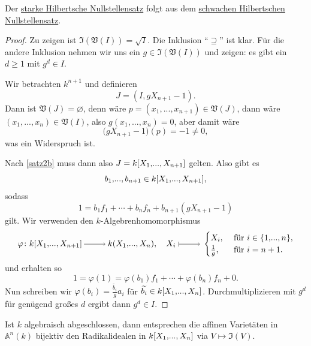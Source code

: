 \documentclass[a4paper,12pt,index=toc]{scrbook}
\theoremstyle{keinenummern} %
\def\A{\mathbb{A}}
\def\V{\mathfrak{V}}
\def\I{\mathfrak{I}}
\renewcommand{\phi}{\varphi}
\newcommand{\leer}{\ensuremath{\varnothing}}
\renewcommand{\dotsc}{\ensuremath{\!...}}
\newcommand{\schlange}[1]{\widetilde{#1}}
\newcommand{\polyx}[1][n]{\ensuremath%
  [X_{1},\dotsc,X_{#1}]}
\begin{document}
\begin{lem}
  Der \hyperref[satz2c]{starke Hilbertsche Nullstellensatz} folgt aus dem \hyperref[satz2b]{schwachen Hilbertschen Nullstellensatz}.
\end{lem}
\begin{proof}
Zu zeigen ist $\I(\V(I))=\sqrt{I}$. Die Inklusion \enquote{$\supseteq$} ist klar. Für die andere Inklusion nehmen wir uns ein
$g\in\I(\V(I))$ und zeigen: es gibt ein $d\ge1$ mit $g^d\in I$.

Wir betrachten $k^{n+1}$ und definieren \begin{equation*}J=(I,gX_{n+1}-1).\end{equation*} Dann ist $\V(J)=\leer$, denn wäre
$p=(x_1,\dotsc,x_{n+1})\in\V(J)$, dann wäre $(x_1,\dotsc,x_n)\in\V(I)$, also $g(x_1,\dotsc,x_n)=0$, aber damit wäre
\begin{equation*}\bigl(gX_{n+1}-1\bigr)(p)=-1\neq0,\end{equation*} was ein Widerspruch ist.

Nach \cref{satz2b} muss dann also $J=k\polyx[n+1]$ gelten. Also gibt es \begin{equation*}b_1,\dotsc,b_{n+1}\in k\polyx[n+1],\end{equation*} sodass
\begin{equation*} 1=b_1f_1 + \dotsm + b_nf_n + b_{n+1}(gX_{n+1}-1) \end{equation*} gilt. Wir verwenden den $k$-Algebrenhomomorphismus
\begin{equation*} \phi\colon k\polyx[n+1] \ra k(X_1,\dotsc,X_n),\quad X_i\mapsto 
\begin{cases}X_{i},&\text{ für }i\in\{1,\dotsc,n\},\\
\frac{1}{g},&\text{ für }i=n+1.\end{cases}\end{equation*}
und erhalten so
\begin{equation*} 1 = \phi(1) = \phi(b_1)f_1 + \dotsm + \phi(b_n)f_n + 0. \end{equation*}
Nun schreiben wir $\phi(b_i)=\frac{\schlange{b_i}}{g}a_i$ für $\schlange{b_i}\in k\polyx$. Durchmultiplizieren mit $g^d$ für genügend
großes $d$ ergibt dann $g^d\in I$.
\end{proof}

\begin{kor}\label{1.3.6}
  Ist $k$ algebraisch abgeschlossen, dann entsprechen die affinen Varietäten in $\A^n(k)$ bijektiv den Radikalidealen in
  $k\polyx$ via $V\mapsto\I(V)$.
\end{kor}
\end{document}
